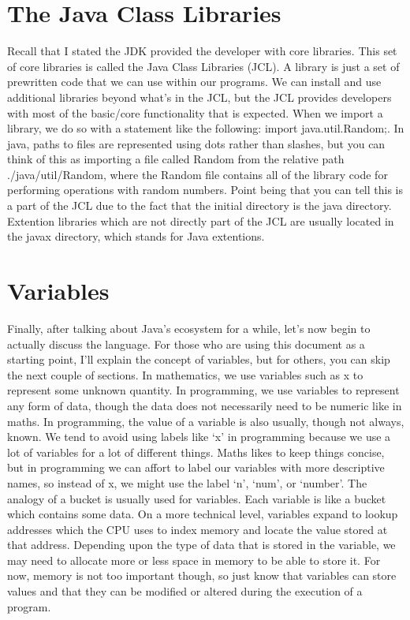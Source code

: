 \documentclass{article}
\begin{document}
\section{The Java Class Libraries}

Recall that I stated the JDK provided the developer with core libraries. This set of core libraries is called
the Java Class Libraries (JCL). A library is just a set of prewritten code that we can use within our
programs. We can install and use additional libraries beyond what’s in the JCL, but the JCL provides
developers with most of the basic/core functionality that is expected. When we import a library, we do so with
a statement like the following: import java.util.Random;. In java, paths to files are represented using dots
rather than slashes, but you can think of this as importing a file called Random from the relative path
./java/util/Random, where the Random file contains all of the library code for performing operations with
random numbers. Point being that you can tell this is a part of the JCL due to the fact that the initial
directory is the java directory. Extention libraries which are not directly part of the JCL are usually
located in the javax directory, which stands for Java extentions.

\section{Variables}

Finally, after talking about Java’s ecosystem for a while, let’s now begin to actually discuss the language.
For those who are using this document as a starting point, I’ll explain the concept of variables, but for
others, you can skip the next couple of sections. In mathematics, we use variables such as x to represent some
unknown quantity. In programming, we use variables to represent any form of data, though the data does not
necessarily need to be numeric like in maths. In programming, the value of a variable is also usually, though
not always, known. We tend to avoid using labels like ‘x’ in programming because we use a lot of variables for
a lot of different things. Maths likes to keep things concise, but in programming we can affort to label our
variables with more descriptive names, so instead of x, we might use the label ‘n’, ‘num’, or ‘number’. The
analogy of a bucket is usually used for variables. Each variable is like a bucket which contains some data. On
a more technical level, variables expand to lookup addresses which the CPU uses to index memory and locate the
value stored at that address. Depending upon the type of data that is stored in the variable, we may need to
allocate more or less space in memory to be able to store it. For now, memory is not too important though, so
just know that variables can store values and that they can be modified or altered during the execution of a
program.
\end{document}
